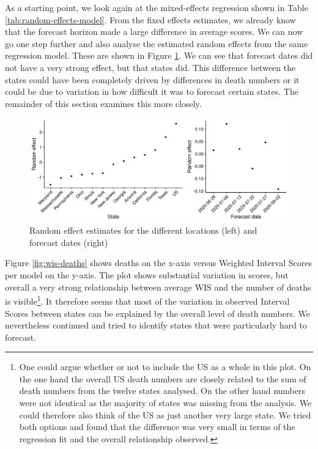 \documentclass[
]{book}
\begin{document}
As a starting point, we look again at the mixed-effects regression shown in Table \ref{tab:random-effects-model}. From the fixed effects estimates, we already know that the forecast horizon made a large difference in average scores. We can now go one step further and also analyse the estimated random effects from the same regression model. These are shown in Figure \ref{fig:random-effects}. We can see that forecast dates did not have a very strong effect, but that states did. This difference between the states could have been completely driven by differences in death numbers or it could be due to variation in how difficult it was to forecast certain states. The remainder of this section examines this more closely.

\begin{figure}
\includegraphics[width=1\linewidth]{../visualisation/chapter-5-results/scenario-baseline/random-effects} \caption{Random effect estimates for the different locations (left) and forecast dates (right)}\label{fig:random-effects}
\end{figure}

Figure \ref{fig:wis-deaths} shows deaths on the x-axis versus Weighted Interval Scores per model on the y-axis. The plot shows substantial variation in scores, but overall a very strong relationship between average WIS and the number of deaths is visible\footnote{One could argue whether or not to include the US as a whole in this plot. On the one hand the overall US death numbers are closely related to the sum of death numbers from the twelve states analysed. On the other hand numbers were not identical as the majority of states was missing from the analysis. We could therefore also think of the US as just another very large state. We tried both options and found that the difference was very small in terms of the regression fit and the overall relationship observed.}. It therefore seems that most of the variation in observed Interval Scores between states can be explained by the overall level of death numbers. We nevertheless continued and tried to identify states that were particularly hard to forecast.
\end{document}
